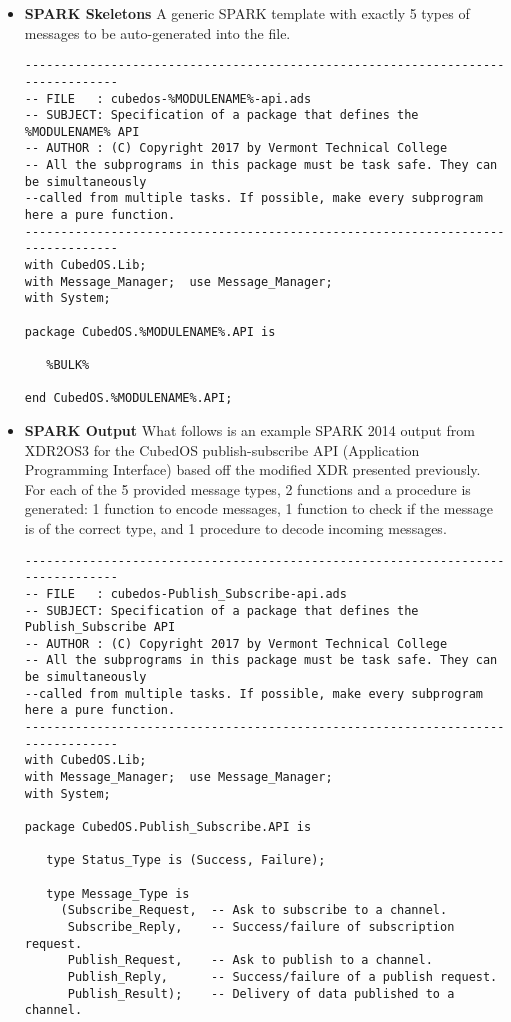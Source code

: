 \begin{itemize}
\item \textbf{SPARK Skeletons} A generic SPARK template with exactly 5 types of messages to be
  auto-generated into the file.
\begin{verbatim}
--------------------------------------------------------------------------------
-- FILE   : cubedos-%MODULENAME%-api.ads
-- SUBJECT: Specification of a package that defines the %MODULENAME% API
-- AUTHOR : (C) Copyright 2017 by Vermont Technical College
-- All the subprograms in this package must be task safe. They can be simultaneously
--called from multiple tasks. If possible, make every subprogram here a pure function.
--------------------------------------------------------------------------------
with CubedOS.Lib;
with Message_Manager;  use Message_Manager;
with System;

package CubedOS.%MODULENAME%.API is

   %BULK%

end CubedOS.%MODULENAME%.API;
\end{verbatim}
  
\item \textbf{SPARK Output} What follows is an example SPARK 2014 output from XDR2OS3 for the
  CubedOS publish-subscribe API (Application Programming Interface) based off the modified XDR
  presented previously. For each of the 5 provided message types, 2 functions and a procedure is
  generated: 1 function to encode messages, 1 function to check if the message is of the correct
  type, and 1 procedure to decode incoming messages.
\begin{verbatim}
--------------------------------------------------------------------------------
-- FILE   : cubedos-Publish_Subscribe-api.ads
-- SUBJECT: Specification of a package that defines the Publish_Subscribe API
-- AUTHOR : (C) Copyright 2017 by Vermont Technical College
-- All the subprograms in this package must be task safe. They can be simultaneously
--called from multiple tasks. If possible, make every subprogram here a pure function.
--------------------------------------------------------------------------------
with CubedOS.Lib;
with Message_Manager;  use Message_Manager;
with System;

package CubedOS.Publish_Subscribe.API is

   type Status_Type is (Success, Failure);

   type Message_Type is
     (Subscribe_Request,  -- Ask to subscribe to a channel.
      Subscribe_Reply,    -- Success/failure of subscription request.
      Publish_Request,    -- Ask to publish to a channel.
      Publish_Reply,      -- Success/failure of a publish request.
      Publish_Result);    -- Delivery of data published to a channel.


\end{verbatim}
\end{itemize}
